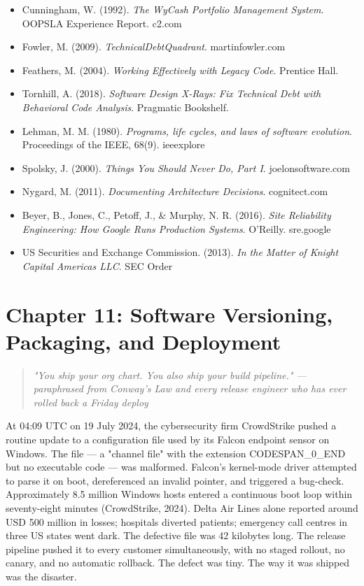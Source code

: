\documentclass[11pt,a4paper]{book}
\begin{document}
\begin{itemize}
  \item Cunningham, W. (1992). \textit{The WyCash Portfolio Management System}. OOPSLA Experience Report. c2.com
  \item Fowler, M. (2009). \textit{TechnicalDebtQuadrant}. martinfowler.com
  \item Feathers, M. (2004). \textit{Working Effectively with Legacy Code}. Prentice Hall.
  \item Tornhill, A. (2018). \textit{Software Design X-Rays: Fix Technical Debt with Behavioral Code Analysis}. Pragmatic Bookshelf.
  \item Lehman, M. M. (1980). \textit{Programs, life cycles, and laws of software evolution}. Proceedings of the IEEE, 68(9). ieeexplore
  \item Spolsky, J. (2000). \textit{Things You Should Never Do, Part I}. joelonsoftware.com
  \item Nygard, M. (2011). \textit{Documenting Architecture Decisions}. cognitect.com
  \item Beyer, B., Jones, C., Petoff, J., \& Murphy, N. R. (2016). \textit{Site Reliability Engineering: How Google Runs Production Systems}. O'Reilly. sre.google
  \item US Securities and Exchange Commission. (2013). \textit{In the Matter of Knight Capital Americas LLC}. SEC Order
\end{itemize}


\chapter{Chapter 11: Software Versioning, Packaging, and Deployment}

\begin{quote}
\textit{\textit{"You ship your org chart. You also ship your build pipeline."} --- paraphrased from Conway's Law and every release engineer who has ever rolled back a Friday deploy}
\end{quote}

\medskip

At 04:09 UTC on 19 July 2024, the cybersecurity firm CrowdStrike pushed a routine update to a configuration file used by its Falcon endpoint sensor on Windows. The file --- a "channel file" with the extension CODESPAN\_0\_END but no executable code --- was malformed. Falcon's kernel-mode driver attempted to parse it on boot, dereferenced an invalid pointer, and triggered a bug-check. Approximately 8.5 million Windows hosts entered a continuous boot loop within seventy-eight minutes (CrowdStrike, 2024). Delta Air Lines alone reported around USD 500 million in losses; hospitals diverted patients; emergency call centres in three US states went dark. The defective file was 42 kilobytes long. The release pipeline pushed it to every customer simultaneously, with no staged rollout, no canary, and no automatic rollback. The defect was tiny. The way it was shipped was the disaster.
\end{document}
